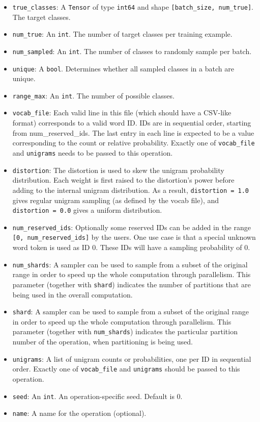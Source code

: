 \begin{itemize}
\tightlist
\item
  \texttt{true\_classes}: A \texttt{Tensor} of type \texttt{int64} and
  shape \texttt{{[}batch\_size,\ num\_true{]}}. The target classes.
\item
  \texttt{num\_true}: An \texttt{int}. The number of target classes per
  training example.
\item
  \texttt{num\_sampled}: An \texttt{int}. The number of classes to
  randomly sample per batch.
\item
  \texttt{unique}: A \texttt{bool}. Determines whether all sampled
  classes in a batch are unique.
\item
  \texttt{range\_max}: An \texttt{int}. The number of possible classes.
\item
  \texttt{vocab\_file}: Each valid line in this file (which should have
  a CSV-like format) corresponds to a valid word ID. IDs are in
  sequential order, starting from num\_reserved\_ids. The last entry in
  each line is expected to be a value corresponding to the count or
  relative probability. Exactly one of \texttt{vocab\_file} and
  \texttt{unigrams} needs to be passed to this operation.
\item
  \texttt{distortion}: The distortion is used to skew the unigram
  probability distribution. Each weight is first raised to the
  distortion's power before adding to the internal unigram distribution.
  As a result, \texttt{distortion\ =\ 1.0} gives regular unigram
  sampling (as defined by the vocab file), and
  \texttt{distortion\ =\ 0.0} gives a uniform distribution.
\item
  \texttt{num\_reserved\_ids}: Optionally some reserved IDs can be added
  in the range \texttt{{[}0,\ num\_reserved\_ids{]}} by the users. One
  use case is that a special unknown word token is used as ID 0. These
  IDs will have a sampling probability of 0.
\item
  \texttt{num\_shards}: A sampler can be used to sample from a subset of
  the original range in order to speed up the whole computation through
  parallelism. This parameter (together with \texttt{shard}) indicates
  the number of partitions that are being used in the overall
  computation.
\item
  \texttt{shard}: A sampler can be used to sample from a subset of the
  original range in order to speed up the whole computation through
  parallelism. This parameter (together with \texttt{num\_shards})
  indicates the particular partition number of the operation, when
  partitioning is being used.
\item
  \texttt{unigrams}: A list of unigram counts or probabilities, one per
  ID in sequential order. Exactly one of \texttt{vocab\_file} and
  \texttt{unigrams} should be passed to this operation.
\item
  \texttt{seed}: An \texttt{int}. An operation-specific seed. Default is
  0.
\item
  \texttt{name}: A name for the operation (optional).
\end{itemize}

